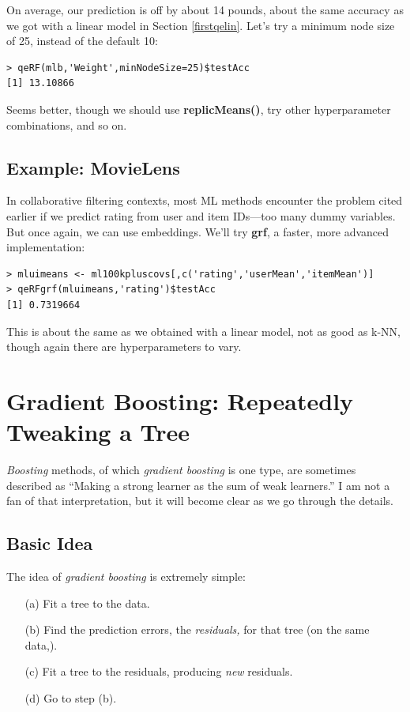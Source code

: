 On average, our prediction is off by about 14 pounds, about the same
accuracy as we got with a linear model in Section \ref{firstqelin}.
Let's try a minimum node size of 25, instead of the default 10:

\begin{lstlisting}
> qeRF(mlb,'Weight',minNodeSize=25)$testAcc
[1] 13.10866
\end{lstlisting}

Seems better, though we should use \textbf{replicMeans()}, try other
hyperparameter combinations, and so on.

\subsection{Example:  MovieLens}

In collaborative filtering contexts, most ML methods encounter the 
problem cited earlier if we predict rating from user and item IDs---too 
many dummy variables.  But once again, we can use embeddings.  We'll try
\textbf{grf}, a faster, more advanced implementation:

\begin{lstlisting}
> mluimeans <- ml100kpluscovs[,c('rating','userMean','itemMean')]
> qeRFgrf(mluimeans,'rating')$testAcc
[1] 0.7319664
\end{lstlisting}

This is about the same as we obtained with a linear model, not as good
as k-NN, though again there are hyperparameters to vary.

\section{Gradient Boosting:  Repeatedly Tweaking a Tree}

\textit{Boosting} methods, of which \textit{gradient boosting} is one
type, are sometimes described as ``Making a strong learner as the
sum of weak learners.''  I am not a fan of that interpretation, but it
will become clear as we go through the details.

\subsection{Basic Idea}

The idea of \textit{gradient boosting} is extremely simple: 

\begin{itemize}

\item [(a)]  Fit a tree to the data.

\item [(b)]  Find the prediction errors, the \textit{residuals,}
for that tree (on the same data,).

\item [(c)]  Fit a tree to the residuals, producing \textit{new}
residuals.

\item [(d)]  Go to step (b).

\end{itemize} 

